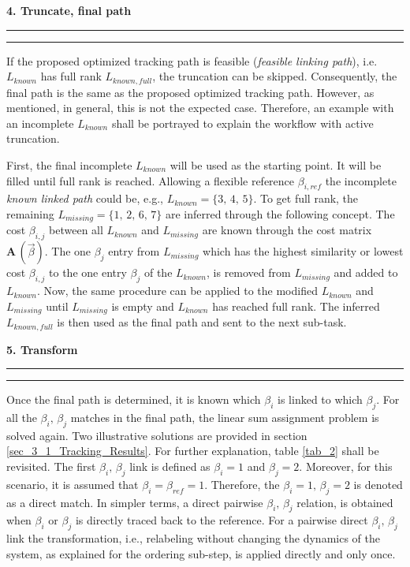 \textbf{4. Truncate, final path}
\hrule
\vspace{0.05cm}
\hrule
\vspace{0.25cm}
If the proposed optimized tracking path is feasible (\emph{feasible linking path}), i.e. $L_{known}$ has full rank $L_{known, full}$, the truncation can be skipped. 
Consequently, the final path is the same as the proposed optimized tracking path.
However, as mentioned, in general, this is not the expected case.
Therefore, an example with an incomplete $L_{known}$ shall be portrayed to explain the workflow with active truncation.\newline 


First, the final incomplete $L_{known}$ will be used as the starting point. 
It will be filled until full rank is reached. 
Allowing a flexible reference $\beta_{i,ref}$ the incomplete \emph{known linked path} could be, e.g., $L_{known} = \{3, \, 4, \, 5\}$. 
To get full rank, the remaining $L_{missing} = \{1, \, 2, \, 6, \, 7\}$ are inferred through the following concept.
The cost $\beta_{i,j}$ between all $L_{known}$ and $L_{missing}$ are known
through the cost matrix $\bm A\,(\vec{\beta })$.
The one $\beta_j$ entry from $L_{missing}$ which has the highest similarity or lowest cost $\beta_{i,j}$ to the one entry $\beta_j$ of the $L_{known}$, is removed from $L_{missing}$ and added to $L_{known}$. 
Now, the same procedure can be applied to the modified $L_{known}$ and $L_{missing}$ until $L_{missing}$ is empty and $L_{known}$ has reached full rank.
The inferred $L_{known, full}$ is then used as the final path and sent to the next sub-task.\newline


\textbf{5. Transform}
\hrule
\vspace{0.05cm}
\hrule
\vspace{0.25cm}
Once the final path is determined, it is known which $\beta_i$ is linked to which $\beta_j$. 
For all the $\beta_{i},\, \beta_j$ matches in the final path, the linear sum assignment problem is solved again.
Two illustrative solutions are provided in section \ref{sec_3_1_Tracking_Results}.
For further explanation, table \ref{tab_2} shall be revisited. 
The first $\beta_{i},\, \beta_j$ link is defined as $\beta_i = 1$ and $\beta_j = 2$. Moreover, for this scenario, it is assumed that $\beta_i = \beta_{ref} = 1$. Therefore, the $\beta_{i} = 1,\, \beta_j= 2$ is denoted as a direct match.
In simpler terms, a direct pairwise $\beta_{i},\, \beta_j$ relation, is obtained when  $\beta_i$ or $\beta_j$ is directly traced back to the reference.
For a pairwise direct $\beta_{i},\, \beta_j$ link the 
transformation, i.e., relabeling without changing the dynamics of the system, as explained for the ordering sub-step, is applied directly and only once.\newline


